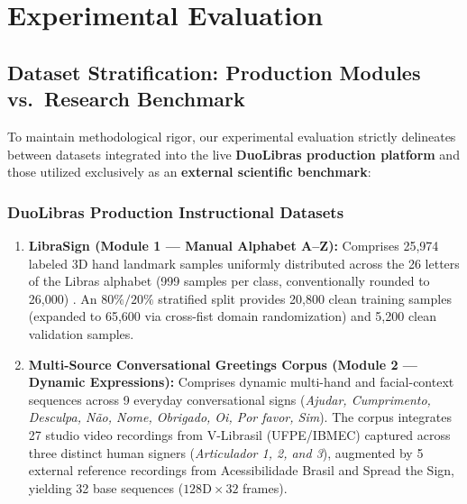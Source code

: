\documentclass[12pt,a4paper]{article}
\begin{document}

\section{Experimental Evaluation}
\label{sec:experiments}

\subsection{Dataset Stratification: Production Modules vs.\ Research Benchmark}

To maintain methodological rigor, our experimental evaluation strictly delineates between datasets integrated into the live \textbf{DuoLibras production platform} and those utilized exclusively as an \textbf{external scientific benchmark}:

\subsubsection{DuoLibras Production Instructional Datasets}
\begin{enumerate}
    \item \textbf{LibraSign (Module 1 --- Manual Alphabet A--Z):} Comprises 25,974 labeled 3D hand landmark samples uniformly distributed across the 26 letters of the Libras alphabet (999 samples per class, conventionally rounded to 26,000) \citep{furtado2023markerless}. An $80\%/20\%$ stratified split provides 20,800 clean training samples (expanded to 65,600 via cross-fist domain randomization) and 5,200 clean validation samples.

    \item \textbf{Multi-Source Conversational Greetings Corpus (Module 2 --- Dynamic Expressions):} Comprises dynamic multi-hand and facial-context sequences across 9 everyday conversational signs (\textit{Ajudar, Cumprimento, Desculpa, N\~ao, Nome, Obrigado, Oi, Por favor, Sim}). The corpus integrates 27 studio video recordings from V-Librasil (UFPE/IBMEC) captured across three distinct human signers (\textit{Articulador 1, 2, and 3}), augmented by 5 external reference recordings from Acessibilidade Brasil and Spread the Sign, yielding 32 base sequences ($128\text{D} \times 32$ frames).
\end{enumerate}
\end{document}
